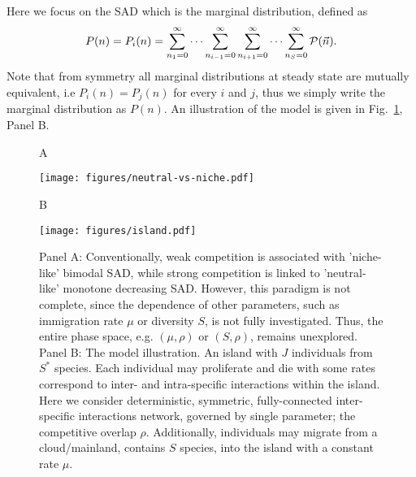 \documentclass[%
 amsmath,amssymb,
reprint,%
linenumbers]{revtex4-2}
\begin{document}
Here we focus on the SAD which is the marginal distribution, defined as
\begin{equation}
  P(n)= P_i(n)=\sum_{n_1=0}^{\infty}\cdots \sum_{n_{i-1}=0}^{\infty}\sum_{n_{i+1}=0}^{\infty}\cdots \sum_{n_S=0}^{\infty}{\rm \mathcal{P}}(\vec{n}).
\end{equation}
Note that from symmetry all marginal distributions at steady state are mutually equivalent, i.e  $P_i(n)=P_j(n)$ for every $i$ and $j$, thus we simply write the marginal distribution as $P(n)$. An illustration of the model is given in Fig.~\ref{fig:fig1}, Panel B.

\iffalse
The master equation for this marginal distribution is one dimensional with rates

\begin{eqnarray}
q^+(n)&=&r^+ n +\mu,  \\
q^-(n)&=&r^- n + \frac{r}{K} n \left((1-\rho)n + \rho \langle J | n_i = n \rangle \right). \nonumber
\end{eqnarray}
\fi

\begin{figure}
   \begin{flushleft}
        A
   \end{flushleft}
    \texttt{[image: figures/neutral-vs-niche.pdf]}
    \begin{flushleft}
        B
   \end{flushleft}
    \texttt{[image: figures/island.pdf]}
    \caption{Panel A: Conventionally, weak competition is associated with 'niche-like' bimodal SAD, while strong competition is linked to 'neutral-like' monotone decreasing SAD. However, this paradigm is not complete, since the dependence of other parameters, such as immigration rate $\mu$ or diversity $S$, is not fully investigated. Thus, the entire phase space, e.g. $(\mu, \rho)$ or $(S, \rho)$,  remains unexplored. Panel B: The model illustration. An island with $J$ individuals from $S^*$ species.  Each individual may proliferate and die with some rates correspond to inter- and intra-specific interactions within the island. Here we consider deterministic, symmetric, fully-connected inter-specific interactions network, governed by single parameter; the competitive overlap $\rho$. Additionally, individuals may migrate from a cloud/mainland, contains $S$ species, into the island with a constant rate $\mu$.       }
    \label{fig:fig1}
\end{figure}
\end{document}
